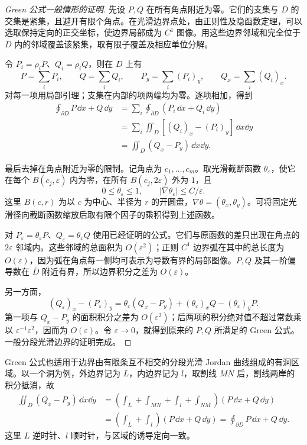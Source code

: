 \begin{proof}[Green 公式一般情形的证明]
先设 $P,Q$ 在所有角点附近为零。它们的支集与 $\overline D$ 的交集是紧集，且避开有限个角点。在光滑边界点处，由正则性及隐函数定理，可以选取保持定向的正交坐标，使边界局部成为 $C^1$ 图像。用这些边界邻域和完全位于 $D$ 内的邻域覆盖该紧集，取有限子覆盖及相应单位分解。

令 $P_i=\rho_iP$、$Q_i=\rho_iQ$，则在 $\overline D$ 上有
\[
P=\sum_iP_i,\qquad Q=\sum_iQ_i,
\qquad P_y=\sum_i(P_i)_y,\qquad Q_x=\sum_i(Q_i)_x.
\]
对每一项用局部引理；支集在内部的项两端均为零。逐项相加，得到
\begin{align*}
\oint_{\partial D}P\,\dd x+Q\,\dd y
&=\sum_i\oint_{\partial D}(P_i\,\dd x+Q_i\,\dd y)\\
&=\sum_i\displaystyle\iint_D[(Q_i)_x-(P_i)_y]\,\dd x\dd y\\
&=\displaystyle\iint_D(Q_x-P_y)\,\dd x\dd y.
\end{align*}

最后去掉在角点附近为零的限制。记角点为 $c_1,\ldots,c_m$。取光滑截断函数 $\theta_\varepsilon$，使它在每个 $B(c_j,\varepsilon)$ 内为零，在所有 $B(c_j,2\varepsilon)$ 外为 $1$，且
\[
0\le\theta_\varepsilon\le1,\qquad
|\nabla\theta_\varepsilon|\le C/\varepsilon.
\]
这里 $B(c,r)$ 为以 $c$ 为中心、半径为 $r$ 的开圆盘，$\nabla\theta=(\theta_x,\theta_y)$。可将固定光滑径向截断函数缩放后取有限个因子的乘积得到上述函数。

对 $P_\varepsilon=\theta_\varepsilon P$、$Q_\varepsilon=\theta_\varepsilon Q$ 使用已经证明的公式。它们与原函数的差只出现在角点的 $2\varepsilon$ 邻域内。这些邻域的总面积为 $O(\varepsilon^2)$；正则 $C^1$ 边界弧在其中的总长度为 $O(\varepsilon)$，因为弧在角点每一侧均可表示为导数有界的局部图像。$P,Q$ 及其一阶偏导数在 $\overline D$ 附近有界，所以边界积分之差为 $O(\varepsilon)$。

另一方面，
\[
(Q_\varepsilon)_x-(P_\varepsilon)_y
=\theta_\varepsilon(Q_x-P_y)
+(\theta_\varepsilon)_xQ-(\theta_\varepsilon)_yP.
\]
第一项与 $Q_x-P_y$ 的面积积分之差为 $O(\varepsilon^2)$；后两项的积分绝对值不超过常数乘以 $\varepsilon^{-1}\varepsilon^2$，因而为 $O(\varepsilon)$。令 $\varepsilon\to0$，就得到原来的 $P,Q$ 所满足的 Green 公式。一般分段光滑边界的证明完成。
\end{proof}

Green 公式也适用于边界由有限条互不相交的分段光滑 Jordan 曲线组成的有洞区域。以一个洞为例，外边界记为 $L$，内边界记为 $l$，取割线 $MN$ 后，割线两岸的积分抵消，故
\[
\begin{aligned}
\displaystyle\iint_D(Q_x-P_y)\,\dd x\dd y
&=\left(\int_L+\int_{MN}+\int_l+\int_{NM}\right)(P\,\dd x+Q\,\dd y)\\
&=\left(\int_L+\int_l\right)(P\,\dd x+Q\,\dd y)
=\oint_{\partial D}P\,\dd x+Q\,\dd y.
\end{aligned}
\]
这里 $L$ 逆时针、$l$ 顺时针，与区域的诱导定向一致。

